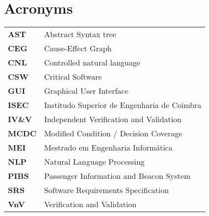 \chapter*{Acronyms}

    \setlength{\LTleft}{0pt}
    \begin{longtable}{l l}
    \textbf{AST}        &   Abstract Syntax tree\\
    \textbf{CEG}        &   Cause-Effect Graph\\
    \textbf{CNL}        &   Controlled natural language\\
    \textbf{CSW}        &   Critical Software\\
    \textbf{GUI}        &   Graphical User Interface\\
    \textbf{ISEC}       &   Institudo Superior de Engenharia de Coimbra\\
    \textbf{IV\&V}      &   Independent Verification and Validation\\
    \textbf{MCDC}       &   Modified Condition / Decision Coverage\\
    \textbf{MEI}        &   Mestrado em Engenharia Informática \\
    \textbf{NLP}        &   Natural Language Processing \\
    \textbf{PIBS}       &   Passenger Information and Beacon System \\
    \textbf{SRS}        &   Software Requirements Specification \\
    \textbf{VnV}        &   Verification and Validation \\
    \end{longtable}
    \label{tab:my_label}
